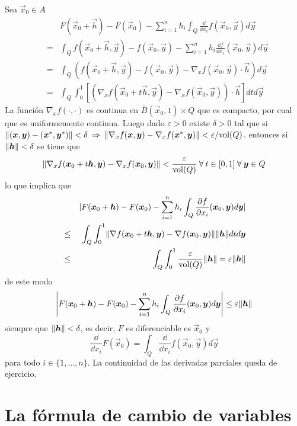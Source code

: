 \begin{demostracion}
Sea $\vec{x}_0\in A$
\begin{eqnarray*}
& &F(\vec{x}_0+\vec{h})-F(\vec{x}_0)-\sum_{i=1}^nh_i\int_Q\frac{\dd}{\dd x_i}f(\vec{x}_0,\vec{y})d\vec{y}\\
& = & \int_Qf(\vec{x}_0+\vec{h},\vec{y})-f(\vec{x}_0,\vec{y})-\sum_{i=1}^nh_i\frac{\dd f}{\dd
x_i}(\vec{x}_0,\vec{y})d\vec{y}\\ &=&
\int_Q(f(\vec{x}_0+\vec{h},\vec{y})-f(\vec{x}_0,\vec{y})-\nabla_xf(\vec{x}_0,\vec{y})\cdot \vec{h})d\vec{y}\\ &=&
\int_Q\int_0^1\left[(\nabla_xf(\vec{x}_0+t\vec{h},\vec{y})-\nabla_xf(\vec{x}_0,\vec{y}))\cdot \vec{h}\right]dtd\vec{y}
\end{eqnarray*}
La funci\'on $\nabla_xf(\cdot,\cdot)$ es continua en $\bar
B(\vec{x}_0,1)\times Q$ que es compacto, por cual que es uniformemente
continua. Luego dado $\varepsilon >0$ existe $\delta >0$ tal que si
$\lVert(\boldsymbol{x},\boldsymbol{y})-(\boldsymbol{x}^*,\boldsymbol{y}^*)\rVert<\delta\:\Rightarrow\:\lVert\nabla_xf(\boldsymbol{x},\boldsymbol{y})-\nabla_xf(\boldsymbol{x}^*,\boldsymbol{y})\rVert<\varepsilon /{\rm vol}(Q)$. entonces si $\lVert\boldsymbol{h}\rVert<\delta$ se tiene
que
\[\lVert\nabla_xf(\boldsymbol{x}_0+t\boldsymbol{h},\boldsymbol{y})-\nabla_xf(\boldsymbol{x}_0,\boldsymbol{y})\rVert<\frac{\varepsilon}{{\rm vol}(Q)}\:\forall\:t\in
[0,1]\:\forall\:\boldsymbol{y}\in Q\] lo que implica que
\begin{eqnarray*}
& &|F(\boldsymbol{x}_0+\boldsymbol{h})-F(\boldsymbol{x}_0)-\sum_{i=1}^nh_i\int_Q\frac{\partial f}{\partial
x_i}(\boldsymbol{x}_0,\boldsymbol{y})d\boldsymbol{y}|\\
&\leq& \int_Q \int_0^1\lVert\nabla
f(\boldsymbol{x}_0+t\boldsymbol{h},\boldsymbol{y})-\nabla f(\boldsymbol{x}_0,\boldsymbol{y})\rVert\lVert\boldsymbol{h}\rVert dtd\boldsymbol{y}
\\ &\leq& \int_Q\int_0^1\frac{\varepsilon}{{\rm vol}(Q)}\lVert\boldsymbol{h}\rVert=\varepsilon\lVert\boldsymbol{h}\rVert
\end{eqnarray*}
de este modo 
$$\left|F(\boldsymbol{x}_0+\boldsymbol{h})-F(\boldsymbol{x}_0)-\sum_{i=1}^nh_i\int_Q\frac{\partial f
}{\partial x_i}(\boldsymbol{x}_0,\boldsymbol{y})d\boldsymbol{y}\right|\leq \varepsilon\lVert\boldsymbol{h}\rVert$$ 
siempre que $\lVert\boldsymbol{h}\rVert<\delta$, es decir, $F$ es diferenciable es $\vec{x}_0$ y
\[\frac{\dd}{\dd x_i}F(\vec{x}_0)=\int_Q\frac{\dd}{\dd x_i}f(\vec{x}_0,\vec{y})d\vec{y}\]
para todo $i\in\{1,\ldots,n\}$. La continuidad de las derivadas parciales
queda de ejercicio.
\end{demostracion}

\section{La f\'ormula de cambio de variables}\label{sec:cambioVariable}

